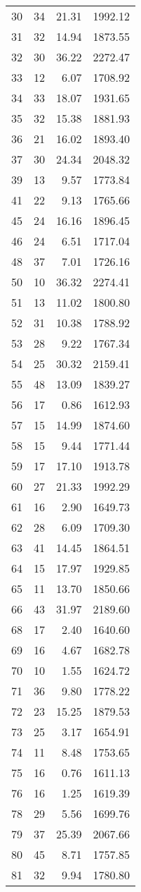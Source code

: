 \begin{appendix}
\begin{compacttable}
\begin{longtable}{@{}rrrr@{}}
30 & 34 & 21.31 & 1992.12 \\
31 & 32 & 14.94 & 1873.55 \\
32 & 30 & 36.22 & 2272.47 \\
33 & 12 & 6.07 & 1708.92 \\
34 & 33 & 18.07 & 1931.65 \\
35 & 32 & 15.38 & 1881.93 \\
36 & 21 & 16.02 & 1893.40 \\
37 & 30 & 24.34 & 2048.32 \\
39 & 13 & 9.57 & 1773.84 \\
41 & 22 & 9.13 & 1765.66 \\
45 & 24 & 16.16 & 1896.45 \\
46 & 24 & 6.51 & 1717.04 \\
48 & 37 & 7.01 & 1726.16 \\
50 & 10 & 36.32 & 2274.41 \\
51 & 13 & 11.02 & 1800.80 \\
52 & 31 & 10.38 & 1788.92 \\
53 & 28 & 9.22 & 1767.34 \\
54 & 25 & 30.32 & 2159.41 \\
55 & 48 & 13.09 & 1839.27 \\
56 & 17 & 0.86 & 1612.93 \\
57 & 15 & 14.99 & 1874.60 \\
58 & 15 & 9.44 & 1771.44 \\
59 & 17 & 17.10 & 1913.78 \\
60 & 27 & 21.33 & 1992.29 \\
61 & 16 & 2.90 & 1649.73 \\
62 & 28 & 6.09 & 1709.30 \\
63 & 41 & 14.45 & 1864.51 \\
64 & 15 & 17.97 & 1929.85 \\
65 & 11 & 13.70 & 1850.66 \\
66 & 43 & 31.97 & 2189.60 \\
68 & 17 & 2.40 & 1640.60 \\
69 & 16 & 4.67 & 1682.78 \\
70 & 10 & 1.55 & 1624.72 \\
71 & 36 & 9.80 & 1778.22 \\
72 & 23 & 15.25 & 1879.53 \\
73 & 25 & 3.17 & 1654.91 \\
74 & 11 & 8.48 & 1753.65 \\
75 & 16 & 0.76 & 1611.13 \\
76 & 16 & 1.25 & 1619.39 \\
78 & 29 & 5.56 & 1699.76 \\
79 & 37 & 25.39 & 2067.66 \\
80 & 45 & 8.71 & 1757.85 \\
81 & 32 & 9.94 & 1780.80 \\
\end{longtable}
\end{compacttable}


\end{appendix}
